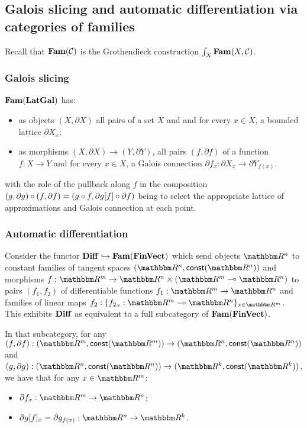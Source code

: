 \subsection{Galois slicing and automatic differentiation via categories of families}
\label{sec:galois-slicing-auto-diff-via-fam}

Recall that $\mathbf{Fam}(\mathcal{C})$ is the Grothendieck construction $\int_{X}\mathbf{Fam}(X, \mathcal{C})$.

\subsubsection{Galois slicing}
\label{sec:galois-slicing-auto-diff-via-fam:galois-slicing}

$\mathbf{Fam}(\mathbf{LatGal})$ has:
\begin{itemize}
\item as objects $(X, \partial X)$ all pairs of a set $X$ and and for every $x \in X$, a bounded lattice
$\partial X_x$;
\item as morphisms $(X, \partial X) \to (Y, \partial Y)$, all pairs $(f, \partial f)$ of a function $f: X \to
Y$ and for every $x \in X$, a Galois connection $\partial f_x: \partial X_x \to \partial Y_{f(x)}$.
\end{itemize}

\noindent with the role of the pullback along $f$ in the composition $(g, \partial g) \circ (f, \partial f) =
(g \circ f, \partial g[f] \circ \partial f)$ being to select the appropriate lattice of
approximations and Galois connection at each point.

\subsubsection{Automatic differentiation}
\label{sec:galois-slicing-auto-diff-via-fam:auto-diff}

Consider the functor $\mathbf{Diff} \hookrightarrow \mathbf{Fam}(\mathbf{FinVect})$ which send objects $\RR^n$ to constant families of
tangent spaces $(\RR^n, \const(\RR^n))$ and morphisms $f: \RR^m \to \RR^n \times (\RR^m \linearto \RR^n)$ to
pairs $(f_1, f_2)$ of differentiable functions $f_1: \RR^m \to \RR^n$ and families of linear maps $f_2:
\{{f_2}_x: \RR^m \linearto \RR^n\}_{x \in \RR^m}$. This exhibits $\mathbf{Diff}$ as equivalent to a full subcategory
of $\mathbf{Fam}(\mathbf{FinVect})$.

In that subcategory, for any $(f, \partial f): (\RR^m, \const(\RR^m)) \to (\RR^n, \const(\RR^n))$ and $(g,
\partial g): (\RR^n, \const(\RR^n)) \to (\RR^k, \const(\RR^k))$, we have that for any $x \in \RR^m$:
\begin{itemize}
\item $\partial f_x: \RR^m \to \RR^n$;
\item $\reindex{\partial g}{f}_x = \partial g_{f(x)}: \RR^n \to \RR^k$.
\end{itemize}

